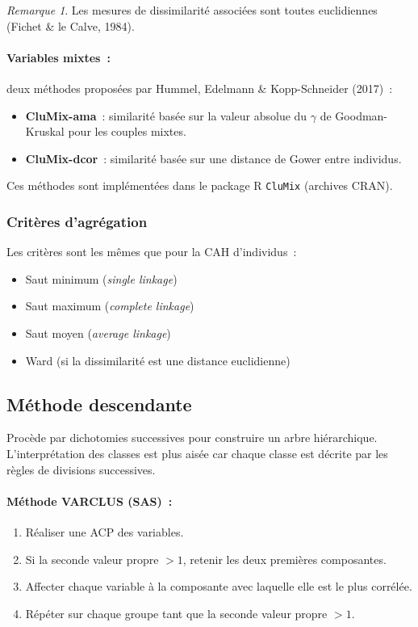 \documentclass[a4paper,11pt]{article}
\theoremstyle{definition}
\theoremstyle{remark}
\newtheorem*{remark}{Remarque}
\begin{document}
\begin{remark}
  Les mesures de dissimilarit\'e associ\'ees sont toutes euclidiennes
  (Fichet \& le Calve, 1984).
\end{remark}

\paragraph*{Variables mixtes~:}
deux m\'ethodes propos\'ees par Hummel, Edelmann \& Kopp-Schneider
(2017)~:
\begin{itemize}
  \item \textbf{CluMix-ama}~: similarit\'e bas\'ee sur la valeur
    absolue du $\gamma$ de Goodman-Kruskal pour les couples mixtes.
  \item \textbf{CluMix-dcor}~: similarit\'e bas\'ee sur une distance
    de Gower entre individus.
\end{itemize}
Ces m\'ethodes sont impl\'ement\'ees dans le package R \texttt{CluMix}
(archives CRAN).

\subsubsection{Crit\`eres d'agr\'egation}

Les crit\`eres sont les m\^emes que pour la CAH d'individus~:
\begin{itemize}
  \item Saut minimum (\emph{single linkage})
  \item Saut maximum (\emph{complete linkage})
  \item Saut moyen (\emph{average linkage})
  \item Ward (si la dissimilarit\'e est une distance euclidienne)
\end{itemize}

\subsection{M\'ethode descendante}

Proc\`ede par dichotomies successives pour construire un arbre
hi\'erarchique. L'interpr\'etation des classes est plus ais\'ee car
chaque classe est d\'ecrite par les r\`egles de divisions successives.

\paragraph*{M\'ethode VARCLUS (SAS)~:}
\begin{enumerate}
  \item R\'ealiser une ACP des variables.
  \item Si la seconde valeur propre $> 1$, retenir les deux premi\`eres
    composantes.
  \item Affecter chaque variable \`a la composante avec laquelle elle
    est le plus corr\'el\'ee.
  \item R\'ep\'eter sur chaque groupe tant que la seconde valeur
    propre $> 1$.
\end{enumerate}
\end{document}
